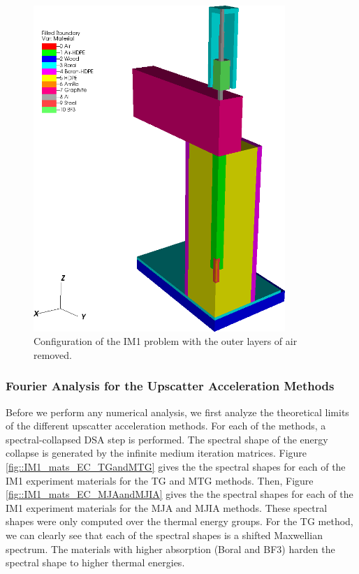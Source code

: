 \begin{figure}
\centering
\includegraphics[width=0.85\textwidth]{figures/sec_DSA/IM1_configuration_Rev1.png}
\caption{Configuration of the IM1 problem with the outer layers of air removed.}
\label{fig::IM1_config_3D}
\end{figure}

\subsubsection{Fourier Analysis for the Upscatter Acceleration Methods}
\label{sec::DSA_Results_IM1_Fourier}

Before we perform any numerical analysis, we first analyze the theoretical limits of the different upscatter acceleration methods. For each of the methods, a spectral-collapsed DSA step is performed. The spectral shape of the energy collapse is generated by the infinite medium iteration matrices. Figure \ref{fig::IM1_mats_EC_TGandMTG} gives the the spectral shapes for each of the IM1 experiment materials for the TG and MTG methods. Then, Figure \ref{fig::IM1_mats_EC_MJAandMJIA} gives the the spectral shapes for each of the IM1 experiment materials for the MJA and MJIA methods. These spectral shapes were only computed over the thermal energy groups. For the TG method, we can clearly see that each of the spectral shapes is a shifted Maxwellian spectrum. The materials with higher absorption (Boral and BF3) harden the spectral shape to higher thermal energies.

